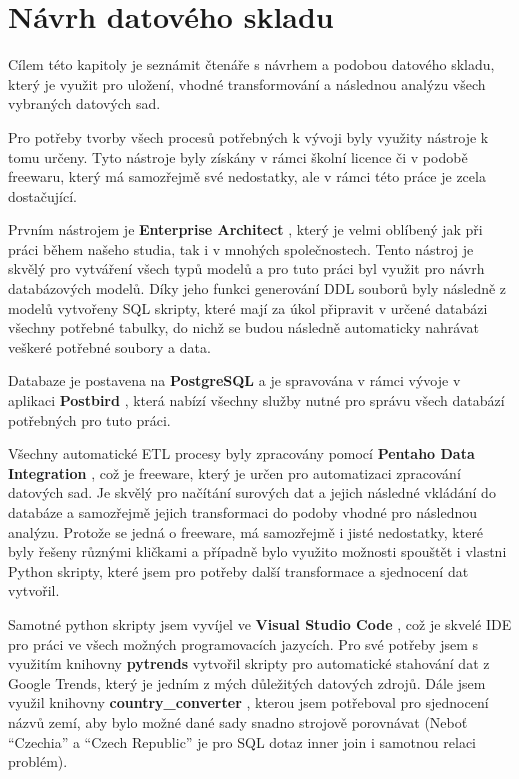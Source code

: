 \documentclass[thesis=M,czech]{FITthesis}[2022/10/08]
\begin{document}
\chapter{Návrh datového skladu}

Cílem této kapitoly je seznámit čtenáře s návrhem a podobou datového skladu, který je využit pro uložení, vhodné transformování a následnou analýzu všech vybraných datových sad. 

Pro potřeby tvorby všech procesů potřebných k vývoji byly využity nástroje k tomu určeny. Tyto nástroje byly získány v rámci školní licence či v podobě freewaru, který má samozřejmě své nedostatky, ale v rámci této práce je zcela dostačující.

Prvním nástrojem je \textbf{Enterprise Architect} \cite{EA}, který je velmi oblíbený jak při práci během našeho studia, tak i v mnohých společnostech. Tento nástroj je skvělý pro vytváření všech typů modelů a pro tuto práci byl využit pro návrh databázových modelů. Díky jeho funkci generování DDL souborů byly následně z modelů vytvořeny SQL skripty, které mají za úkol připravit v určené databázi všechny potřebné tabulky, do nichž se budou následně automaticky nahrávat veškeré potřebné soubory a data.

Databaze je postavena na \textbf{PostgreSQL} \cite{postgres} a je spravována v rámci vývoje v aplikaci \textbf{Postbird} \cite{postbird}, která nabízí všechny služby nutné pro správu všech databází potřebných pro tuto práci. 

Všechny automatické ETL procesy byly zpracovány pomocí \textbf{Pentaho Data Integration} \cite{pentaho}, což je freeware, který je určen pro automatizaci zpracování datových sad. Je skvělý pro načítání surových dat a jejich následné vkládání do databáze a samozřejmě jejich transformaci do podoby vhodné pro následnou analýzu. Protože se jedná o freeware, má samozřejmě i jisté nedostatky, které byly řešeny různými kličkami a případně bylo využito možnosti spouštět i vlastni Python skripty, které jsem pro potřeby další transformace a sjednocení dat vytvořil.

Samotné python skripty jsem vyvíjel ve \textbf{Visual Studio Code} \cite{VSC}, což je skvelé IDE pro práci ve všech možných programovacích jazycích. Pro své potřeby jsem  s využitím knihovny \textbf{pytrends} \cite{pytrends} vytvořil skripty pro automatické stahování dat z Google Trends, který je jedním z mých důležitých datových zdrojů. Dále jsem využil knihovny \textbf{country\_converter} \cite{CC}, kterou jsem potřeboval pro sjednocení názvů zemí, aby bylo možné dané sady snadno strojově porovnávat (Neboť “Czechia” a “Czech Republic” je pro SQL dotaz inner join i samotnou relaci problém).
\end{document}

